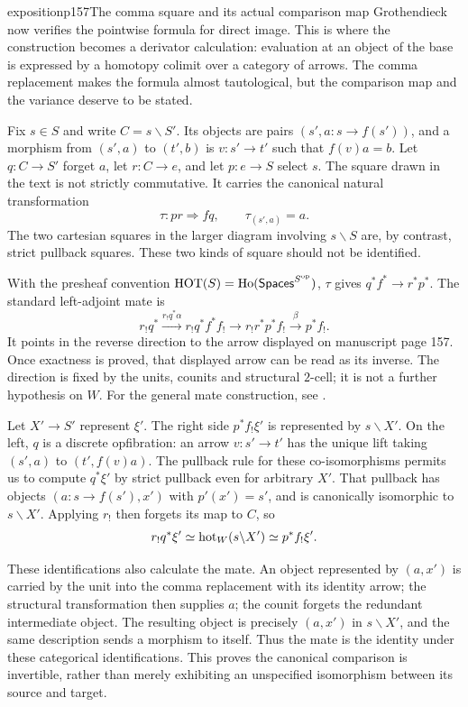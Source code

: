 \begin{dcomment}{exposition}{p157}{The comma square and its actual comparison map}
Grothendieck now verifies the pointwise formula for direct image. This is where the construction becomes a derivator calculation: evaluation at an object of the base is expressed by a homotopy colimit over a category of arrows. The comma replacement makes the formula almost tautological, but the comparison map and the variance deserve to be stated.

Fix $s\in S$ and write $C=s\backslash S'$. Its objects are pairs $(s',a:s\longrightarrow f(s'))$, and a morphism from $(s',a)$ to $(t',b)$ is $v:s'\longrightarrow t'$ such that $f(v)a=b$. Let $q:C\longrightarrow S'$ forget $a$, let $r:C\longrightarrow e$, and let $p:e\longrightarrow S$ select $s$. The square drawn in the text is not strictly commutative. It carries the canonical natural transformation
\[
 \tau:pr\Longrightarrow fq,
 \qquad \tau_{(s',a)}=a.
\]
The two cartesian squares in the larger diagram involving $s\backslash S$ are, by contrast, strict pullback squares. These two kinds of square should not be identified.

With the presheaf convention $\mathrm{HOT}(S)=\operatorname{Ho}(\mathsf{Spaces}^{S^{\mathrm{op}}})$, $\tau$ gives $q^*f^*\longrightarrow r^*p^*$. The standard left-adjoint mate is
\[
 r_!q^*\xrightarrow{r_!q^*\alpha}
 r_!q^*f^*f_!\longrightarrow
 r_!r^*p^*f_!\xrightarrow{\beta}
 p^*f_!.
\]
It points in the reverse direction to the arrow displayed on manuscript page 157. Once exactness is proved, that displayed arrow can be read as its inverse. The direction is fixed by the units, counits and structural $2$-cell; it is not a further hypothesis on $W$. For the general mate construction, see \citet[Proposition~4.3.8]{Riehl2016}.

Let $X'\longrightarrow S'$ represent $\xi'$. The right side $p^*f_!\xi'$ is represented by $s\backslash X'$. On the left, $q$ is a discrete opfibration: an arrow $v:s'\longrightarrow t'$ has the unique lift taking $(s',a)$ to $(t',f(v)a)$. The pullback rule for these co-isomorphisms permits us to compute $q^*\xi'$ by strict pullback even for arbitrary $X'$. That pullback has objects $(a:s\longrightarrow f(s'),x')$ with $p'(x')=s'$, and is canonically isomorphic to $s\backslash X'$. Applying $r_!$ then forgets its map to $C$, so
\[
 r_!q^*\xi'\simeq\mathrm{hot}_W(s\backslash X')
 \simeq p^*f_!\xi'.
\]

These identifications also calculate the mate. An object represented by $(a,x')$ is carried by the unit into the comma replacement with its identity arrow; the structural transformation then supplies $a$; the counit forgets the redundant intermediate object. The resulting object is precisely $(a,x')$ in $s\backslash X'$, and the same description sends a morphism to itself. Thus the mate is the identity under these categorical identifications. This proves the canonical comparison is invertible, rather than merely exhibiting an unspecified isomorphism between its source and target.


\end{dcomment}
